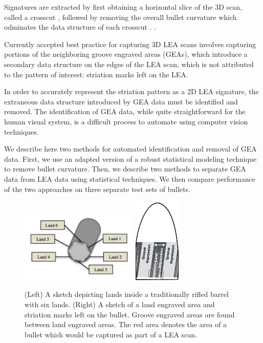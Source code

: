 \documentclass[12pt]{article}
\begin{document}
Signatures are extracted by first obtaining a horizontal slice of the 3D
scan, called a crosscut , followed by removing the overall
bullet curvature which odminates the data structure of each crosscut
. .

Currently accepted best practice for capturing 3D LEA scans involves
capturing portions of the neighboring groove engraved areas (GEAs),
which introduce a secondary data structure on the edges of the LEA scan,
which is not attributed to the pattern of interest: striation marks left
on the LEA.

In order to accurately represent the striation pattern as a 2D LEA
signature, the extraneous data structure introduced by GEA data must be
identified and removed. The identification of GEA data, while quite
straightforward for the human visual system, is a difficult process to
automate using computer vision techniques.

We describe here two methods for automated identification and removal of
GEA data. First, we use an adapted version of a robust statistical
modeling technique to remove bullet curvature. Then, we describe two
methods to separate GEA data from LEA data using statistical techniques.
We then compare performance of the two approaches on three separate test
sets of bullets.

\begin{figure}

\includegraphics[width=0.5\textwidth]{../images/scanning-stage0}
\hspace{3cm}
\includegraphics[width=0.2\textwidth]{../images/bullet-sketch}
\caption{(Left) A sketch depicting lands inside a traditionally rifled barrel with six lands. (Right) A sketch of a land engraved area and striation marks left on the bullet. Groove engraved areas are found between land engraved areas. The red area denotes the area of a bullet which would be captured as part of a LEA scan.}
\label{barrel-bullet}
\end{figure}
\end{document}
